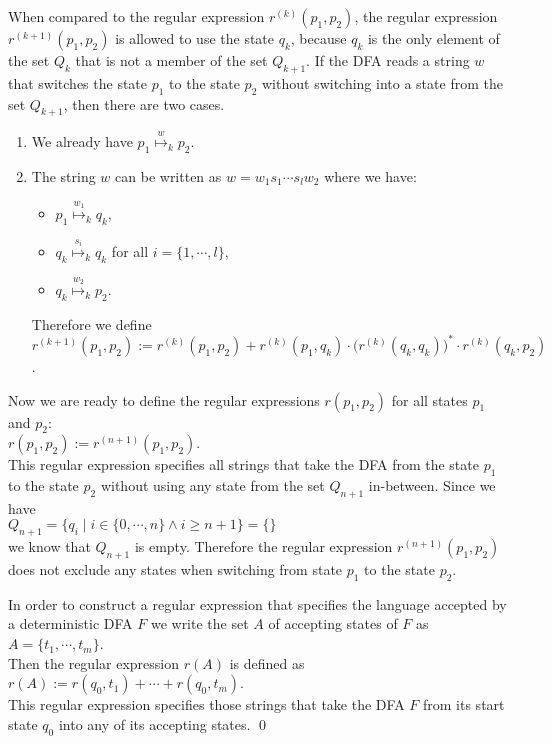 \begin{enumerate}
  When compared to the regular expression $r^{(k)}(p_1, p_2)$,
  the regular expression  $r^{(k+1)}(p_1, p_2)$ is allowed to use the state
  $q_k$, because $q_k$ is the only element of the set $Q_k$ that is not a member of the set $Q_{k+1}$.  
  If the \textsc{DFA} reads a string $w$ that switches the state $p_1$ to the state $p_2$ without switching into a state
  from the set $Q_{k+1}$, then there are two cases.
  \begin{enumerate}
  \item We already have $p_1 \stackrel{w}{\mapsto}_k p_2$.
  \item The string $w$ can be written as  $w = w_1 s_1\cdots s_l w_2$ where we have:
        \begin{itemize}
        \item $p_1 \stackrel{w_1}{\mapsto}_k q_k$,
        \item $q_k \stackrel{s_i}{\mapsto}_k q_k$ \quad for all $i = \{ 1, \cdots, l\}$,
        \item $q_k \stackrel{w_2}{\mapsto}_k p_2$.
        \end{itemize}
        Therefore we define
        \\[0.2cm]
        \hspace*{1.3cm}
        $r^{(k+1)}(p_1,p_2) := 
         r^{(k)}(p_1,p_2) + 
         r^{(k)}(p_1,q_k) \cdot \bigl(r^{(k)}(q_k,q_k)\bigr)^* \cdot r^{(k)}(q_k,p_2)$.
  \end{enumerate}  
\end{enumerate}
Now we are ready to define the regular expressions $r(p_1,p_2)$ for all states $p_1$ and $p_2$:
\\[0.2cm]
\hspace*{1.3cm}
$r(p_1,p_2) := r^{(n+1)}(p_1,p_2)$. 
\\[0.2cm]
This regular expression specifies all strings that take the \textsc{DFA} from the state
$p_1$ to the state $p_2$ without using any state from the set 
$Q_{n+1}$ in-between.   Since we have
\\[0.2cm]
\hspace*{1.3cm}
$Q_{n+1} = \bigl\{ q_i \mid i \in \{0,\cdots,n \} \wedge i \geq n+1 \bigr\} = \{\}$
\\[0.2cm]
we know that $Q_{n+1}$ is empty.
Therefore the regular expression $r^{(n+1)}(p_1,p_2)$
does not exclude any states when switching from
state $p_1$ to the state $p_2$.

In order to construct a regular expression that specifies the language accepted by a deterministic \textsc{DFA}
$F$ we write the set $A$ of accepting states of $F$ as
\\[0.2cm]
\hspace*{1.3cm}
$A = \{ t_1, \cdots, t_m \}$.
\\[0.2cm]
Then the regular expression $r(A)$ is defined as
\\[0.2cm]
\hspace*{1.3cm}
$r(A) := r(q_0, t_1) + \cdots + r(q_0, t_m)$.
\\[0.2cm]
This regular expression specifies those strings that take the \textsc{DFA} $F$ from its start state $q_0$ into
any of its accepting states.
\qed


